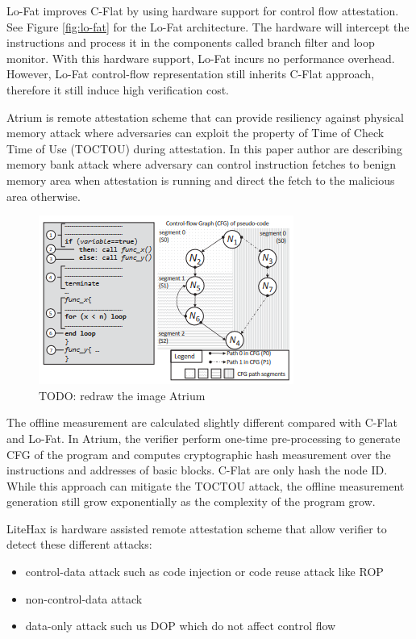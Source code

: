Lo-Fat\cite{dessoukyLOFATLowOverheadControl2017} improves C-Flat by using
hardware support for control flow attestation. See Figure \ref{fig:lo-fat} for
the Lo-Fat architecture. The hardware will intercept the instructions and
process it in the components called branch filter and loop monitor. With this
hardware support, Lo-Fat incurs no performance overhead. However, Lo-Fat
control-flow representation still inherits C-Flat approach, therefore it still
induce high verification cost.

Atrium \cite{zeitouniATRIUMRuntimeAttestation2017} is remote attestation scheme that can provide resiliency against physical memory attack where adversaries can exploit the property of Time of Check Time of Use (TOCTOU) during attestation. In this paper author are describing memory bank attack where adversary can control instruction fetches to benign memory area when attestation is running and direct the fetch to the malicious area otherwise.

\begin{figure}[htbp]
\centerline{\includegraphics[scale=1]{Figures/01/atrium.png}}
\caption{TODO: redraw the image Atrium}
\label{fig:atrium}
\end{figure}

The offline measurement are calculated slightly different compared with C-Flat and Lo-Fat. In Atrium, the verifier perform one-time pre-processing to generate CFG of the program and computes cryptographic hash measurement over the instructions and addresses of basic blocks. C-Flat are only hash the node ID. While this approach can mitigate the TOCTOU attack, the offline measurement generation still grow exponentially as the complexity of the program grow. 

LiteHax \cite{dessoukyLiteHAXLightweightHardwareassisted2018} is hardware assisted remote attestation scheme that allow verifier to detect these different attacks:

\begin{itemize}
    \item control-data attack such as code injection or code reuse attack like ROP
    \item non-control-data attack
    \item data-only attack such us DOP which do not affect control flow
\end{itemize}

